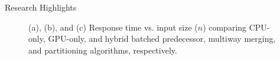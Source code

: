 \documentclass[final]{beamer}
\newlength{\colwidth}
\begin{document}
\begin{frame}[t]
\begin{columns}[t]
\begin{column}{\colwidth}
\begin{block}{Research Highlights}
 \begin{figure}[htp]
\centering
{}
    \caption{(a), (b), and (c) Response time vs. input size ($n$) comparing CPU-only, GPU-only, and hybrid batched predecessor, multiway merging, and partitioning algorithms, respectively.}
   \label{fig:predecessor_search_results}
\end{figure}
 


\end{block}
\end{column}
\end{columns}
\end{frame}
\end{document}
